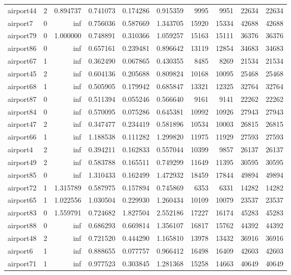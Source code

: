 \begin{longtable}{|l|r|r|r|r|r|r|r|r|r|}
airport44 & 2 & 0.894737 & 0.741073 & 0.174286 & 0.915359 & 9995 & 9951 & 22634 & 22634 \\
airport7 & 0 & inf & 0.756036 & 0.587669 & 1.343705 & 15920 & 15334 & 42688 & 42688 \\
airport79 & 0 & 1.000000 & 0.748891 & 0.310366 & 1.059257 & 15163 & 15111 & 36376 & 36376 \\
airport86 & 0 & inf & 0.657161 & 0.239481 & 0.896642 & 13119 & 12854 & 34683 & 34683 \\
airport67 & 1 & inf & 0.362490 & 0.067865 & 0.430355 & 8485 & 8269 & 21534 & 21534 \\
airport45 & 2 & inf & 0.604136 & 0.205688 & 0.809824 & 10168 & 10095 & 25468 & 25468 \\
airport68 & 1 & inf & 0.505905 & 0.179942 & 0.685847 & 13321 & 12325 & 32764 & 32764 \\
airport87 & 0 & inf & 0.511394 & 0.055246 & 0.566640 & 9161 & 9141 & 22262 & 22262 \\
airport84 & 0 & inf & 0.570095 & 0.075286 & 0.645381 & 10992 & 10926 & 27943 & 27943 \\
airport47 & 2 & inf & 0.347477 & 0.234419 & 0.581896 & 10534 & 10003 & 26815 & 26815 \\
airport66 & 1 & inf & 1.188538 & 0.111282 & 1.299820 & 11975 & 11929 & 27593 & 27593 \\
airport4 & 2 & inf & 0.394211 & 0.162833 & 0.557044 & 10399 & 9857 & 26137 & 26137 \\
airport49 & 2 & inf & 0.583788 & 0.165511 & 0.749299 & 11649 & 11395 & 30595 & 30595 \\
airport85 & 0 & inf & 1.310433 & 0.162499 & 1.472932 & 18459 & 17844 & 49894 & 49894 \\
airport72 & 1 & 1.315789 & 0.587975 & 0.157894 & 0.745869 & 6353 & 6331 & 14282 & 14282 \\
airport65 & 1 & 1.022556 & 1.030504 & 0.229930 & 1.260434 & 10109 & 10079 & 23537 & 23537 \\
airport83 & 0 & 1.559791 & 0.724682 & 1.827504 & 2.552186 & 17227 & 16174 & 45283 & 45283 \\
airport88 & 0 & inf & 0.686293 & 0.669814 & 1.356107 & 16817 & 15762 & 44392 & 44392 \\
airport48 & 2 & inf & 0.721520 & 0.444290 & 1.165810 & 13978 & 13432 & 36916 & 36916 \\
airport6 & 1 & inf & 0.888655 & 0.077757 & 0.966412 & 16498 & 16409 & 42603 & 42603 \\
airport71 & 1 & inf & 0.977523 & 0.303845 & 1.281368 & 15258 & 14663 & 40649 & 40649 \\

\end{longtable}
